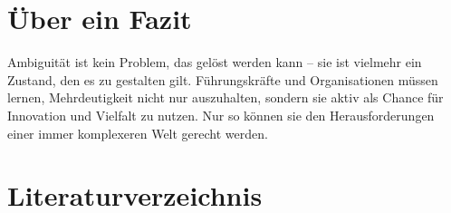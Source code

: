 \documentclass[
  ngerman,
  letterpaper,
  DIV=11]{scrartcl}
\begin{document}
\section{Über ein Fazit}\label{uxfcber-ein-fazit}

Ambiguität ist kein Problem, das gelöst werden kann -- sie ist vielmehr
ein Zustand, den es zu gestalten gilt. Führungskräfte und Organisationen
müssen lernen, Mehrdeutigkeit nicht nur auszuhalten, sondern sie aktiv
als Chance für Innovation und Vielfalt zu nutzen. Nur so können sie den
Herausforderungen einer immer komplexeren Welt gerecht werden.

\section{Literaturverzeichnis}\label{literaturverzeichnis}

\printbibliography[heading=none]
\end{document}
